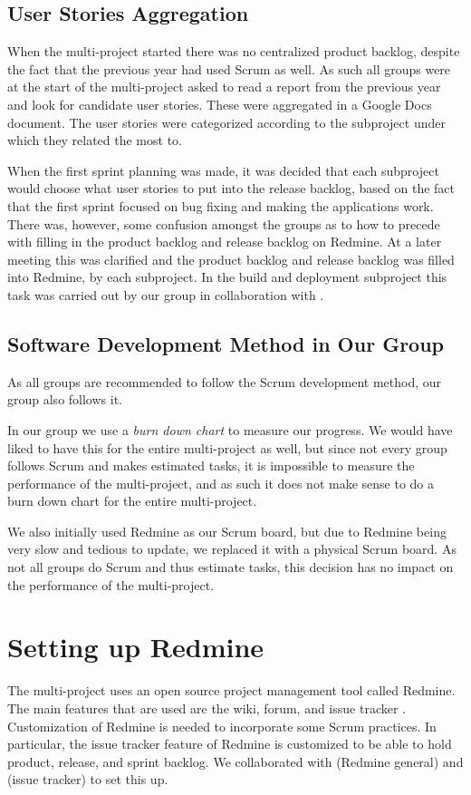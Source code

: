 \subsection{User Stories Aggregation}
When the multi-project started there was no centralized product backlog, despite the fact that the previous year had used Scrum as well. As such all groups were at the start of the multi-project asked to read a report from the previous year and look for candidate user stories. These were aggregated in a Google Docs document. The user stories were categorized according to the subproject under which they related the most to.

When the first sprint planning was made, it was decided that each subproject would choose what user stories to put into the release backlog, based on the fact that the first sprint focused on bug fixing and making the applications work. There was, however, some confusion amongst the groups as to how to precede with filling in the product backlog and release backlog on Redmine. At a later meeting this was clarified and the product backlog and release backlog was filled into Redmine, by each subproject. In the build and deployment subproject this task was carried out by our group in collaboration with .

\subsection{Software Development Method in Our Group}
As all groups are recommended to follow the Scrum development method, our group also follows it. 

In our group we use a \emph{burn down chart} to measure our progress. We would have liked to have this for the entire multi-project as well, but since not every group follows Scrum and makes estimated tasks, it is impossible to measure the performance of the multi-project, and as such it does not make sense to do a burn down chart for the entire multi-project.

We also initially used Redmine as our Scrum board, but due to Redmine being very slow and tedious to update, we replaced it with a physical Scrum board. As not all groups do Scrum and thus estimate tasks, this decision has no impact on the performance of the multi-project.

\section{Setting up Redmine}\label{sec:redmine}
The multi-project uses an open source project management tool called Redmine. The main features that are used are the wiki, forum, and issue tracker . Customization of Redmine is needed to incorporate some Scrum practices. In particular, the issue tracker feature of Redmine is customized to be able to hold product, release, and sprint backlog. We collaborated with  (Redmine general) and  (issue tracker) to set this up. 

